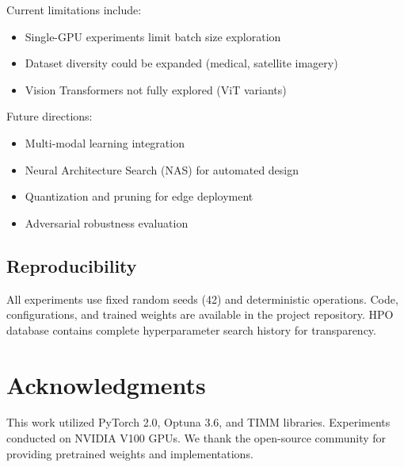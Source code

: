Current limitations include:
\begin{itemize}
    \item Single-GPU experiments limit batch size exploration
    \item Dataset diversity could be expanded (medical, satellite imagery)
    \item Vision Transformers not fully explored (ViT variants)
\end{itemize}

Future directions:
\begin{itemize}
    \item Multi-modal learning integration
    \item Neural Architecture Search (NAS) for automated design
    \item Quantization and pruning for edge deployment
    \item Adversarial robustness evaluation
\end{itemize}

\subsection{Reproducibility}

All experiments use fixed random seeds (42) and deterministic operations. Code, configurations, and trained weights are available in the project repository. HPO database contains complete hyperparameter search history for transparency.

\section{Acknowledgments}

This work utilized PyTorch 2.0, Optuna 3.6, and TIMM libraries. Experiments conducted on NVIDIA V100 GPUs. We thank the open-source community for providing pretrained weights and implementations.
